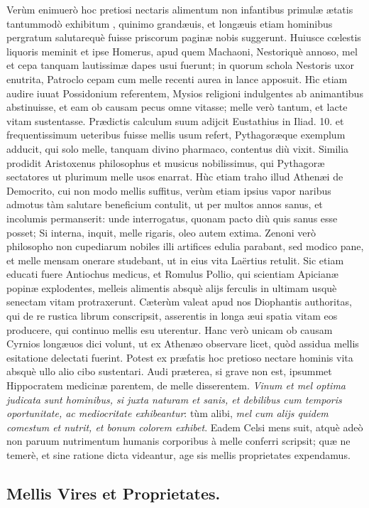\documentclass[a4paper, 11pt, oneside, polutonikogreek, latin]{article}
\begin{document}
Verùm enimuerò hoc pretiosi nectaris alimentum non infantibus primulæ ætatis tantummodò exhibitum , quinimo grandæuis, et longæuis etiam hominibus pergratum salutarequè fuisse priscorum paginæ nobis suggerunt. Huiusce cœlestis liquoris meminit et ipse Homerus, apud quem Machaoni, Nestoriquè annoso, mel et cepa tanquam lautissimæ dapes usui fuerunt; in quorum schola Nestoris uxor enutrita, Patroclo cepam cum melle recenti aurea in lance apposuit. Hìc etiam audire iuuat Possidonium referentem, Mysios religioni indulgentes ab animantibus abstinuisse, et eam ob causam pecus omne vitasse; melle verò tantum, et lacte vitam sustentasse. Prædictis calculum suum adijcit Eustathius in Iliad. 10. et frequentissimum ueteribus fuisse mellis usum refert, Pythagoræque exemplum adducit, qui solo melle, tanquam divino pharmaco, contentus diù vixit. Similia prodidit Aristoxenus philosophus et musicus nobilissimus, qui Pythagoræ sectatores ut plurimum melle usos enarrat. Hùc etiam traho illud Athenæi de Democrito, cui non modo mellis suffitus, verùm etiam ipsius vapor naribus admotus tàm salutare beneficium contulit, ut per multos annos sanus, et incolumis permanserit: unde interrogatus, quonam pacto diù quis sanus esse posset; Si interna, inquit, melle rigaris, oleo autem extima. Zenoni verò philosopho non cupediarum nobiles illi artifices edulia parabant, sed modico pane, et melle mensam onerare studebant, ut in eius vita Laërtius retulit. Sic etiam educati fuere Antiochus medicus, et Romulus Pollio, qui scientiam Apicianæ popinæ explodentes, melleis alimentis absquè alijs ferculis in ultimam usquè senectam vitam protraxerunt. Cæterùm valeat apud nos Diophantis authoritas, qui de re rustica librum conscripsit, asserentis in longa æui spatia vitam eos producere, qui continuo mellis esu uterentur. Hanc verò unicam ob causam Cyrnios longæuos dici volunt, ut ex Athenæo observare licet, quòd assidua mellis esitatione delectati fuerint. Potest ex præfatis hoc pretioso nectare hominis vita absquè ullo alio cibo sustentari. Audi præterea, si grave non est, ipsummet Hippocratem medicinæ parentem, de melle disserentem. \emph{Vinum et mel optima judicata sunt hominibus, si juxta naturam et sanis, et debilibus cum temporis oportunitate, ac mediocritate exhibeantur}: tùm alibi, \emph{mel cum alijs quidem comestum et nutrit, et bonum colorem exhibet}. Eadem Celsi mens suit, atquè adeò non paruum nutrimentum humanis corporibus à melle conferri scripsit; quæ ne temerè, et sine ratione dicta videantur, age sis mellis proprietates expendamus.
\clearpage
\subsection{Mellis Vires et Proprietates.}
\end{document}
